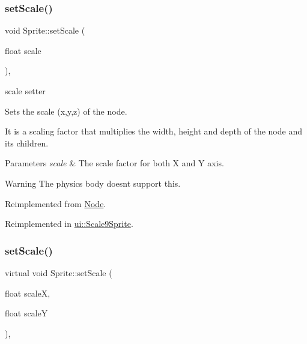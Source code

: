 \mbox{\label{classSprite_a91251019ce74f40cc8d0f04a1dbf70c1}} 
\subsubsection{\texorpdfstring{set\+Scale()}{setScale()}\hspace{0.1cm}{\footnotesize\ttfamily [2/4]}}
{\footnotesize\ttfamily void Sprite\+::set\+Scale (\begin{DoxyParamCaption}\item[{float}]{scale }\end{DoxyParamCaption})\hspace{0.3cm}{\ttfamily [override]}, {\ttfamily [virtual]}}



scale setter 

Sets the scale (x,y,z) of the node.

It is a scaling factor that multiplies the width, height and depth of the node and its children.


\begin{DoxyParams}{Parameters}
{\em scale} & The scale factor for both X and Y axis.\\
\hline
\end{DoxyParams}
\begin{DoxyWarning}{Warning}
The physics body doesn\textquotesingle{}t support this. 
\end{DoxyWarning}


Reimplemented from \hyperlink{classNode_acf0955a52f51a9d6c8b0c9267b1e8668}{Node}.



Reimplemented in \hyperlink{classui_1_1Scale9Sprite_a6824394dc8d5f26668b5e6f8b3cae3ba}{ui\+::\+Scale9\+Sprite}.

\mbox{\label{classSprite_a52e1d2937d38baf4ad067f029e33b901}} 
\subsubsection{\texorpdfstring{set\+Scale()}{setScale()}\hspace{0.1cm}{\footnotesize\ttfamily [3/4]}}
{\footnotesize\ttfamily virtual void Sprite\+::set\+Scale (\begin{DoxyParamCaption}\item[{float}]{scaleX,  }\item[{float}]{scaleY }\end{DoxyParamCaption})\hspace{0.3cm}{\ttfamily [override]}, {\ttfamily [virtual]}}



